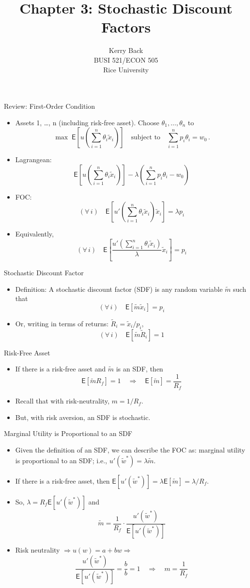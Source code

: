 \documentclass[10pt]{beamer}
\title{Chapter 3: Stochastic Discount Factors}
\date{}
\author{Kerry Back\\ 
BUSI 521/ECON 505\\
Rice University}
\newcommand{\bi}{\begin{itemize}}
\newcommand{\ei}{\end{itemize}}
\newcommand{\im}{\item}
\newcommand{\mye}{\ensuremath{\mathsf{E}}}
\newcommand{\tw}{\tilde{w}}
\newcommand{\tx}{\tilde{x}}
\newcommand{\tm}{\tilde{m}}
\newcommand{\tr}{\widetilde{R}}
\begin{document}
\maketitle



\begin{frame}{Review: First-Order Condition}
 \bi
 \im Assets 1, \ldots, n (including risk-free asset).  Choose $\theta_1, \ldots, \theta_n$ to 
 $$\max \; \mye\left[ u\left( \sum_{i=1}^n \theta_i\tx_i \right) \right] \quad \text{subject to} \quad \sum_{i=1}^n p_i \theta_i = w_0\,.$$
\im Lagrangean:
$$\mye\left[ u\left( \sum_{i=1}^n \theta_i\tx_i \right) \right] - \lambda \left( \sum_{i=1}^n p_i \theta_i - w_0 \right)$$
\im FOC:
$$(\forall \, i) \quad \mye\left[ u'\left( \sum_{i=1}^n \theta_i\tx_i \right) \tx_i \right] = \lambda p_i$$
\im Equivalently,
$$(\forall \, i) \quad \mye\left[ \frac{u'\left( \sum_{i=1}^n \theta_i\tx_i \right) }{\lambda}\tx_i \right] =  p_i$$
\ei
\end{frame}

\begin{frame}{Stochastic Discount Factor}
    \bi 
    \im Definition: A stochastic discount factor (SDF) is any random variable $\tm$ such that
    $$(\forall \, i) \quad \mye\left[ \tm\tx_i \right] =  p_i$$
    \im Or, writing in terms of returns: $\tr_i = \tx_i/p_i$,
    $$(\forall \, i) \quad \mye\left[ \tm\tr_i \right] =  1$$
    \ei 
\end{frame}

\begin{frame}{Risk-Free Asset}
    \bi 
    \im If there is a risk-free asset and $\tm$ is an SDF, then 
    $$\mye[\tm R_f] = 1 \quad \Rightarrow \quad \mye[\tm] = \frac{1}{R_f}$$
    \im Recall that with risk-neutrality, $ m =1/R_f$.
    \im But, with risk aversion, an SDF is stochastic.
    \ei 
\end{frame}

\begin{frame}{Marginal Utility is Proportional to an SDF}
    \bi 
    \im 
    Given the definition of an SDF, we can describe the FOC as: marginal utility is proportional to an SDF; i.e., $u'(\tw^*) = \lambda\tm$.
    \im If there is a risk-free asset, then $\mye[u'(\tw^*)] = \lambda \mye[\tm] = \lambda / R_f$.
    \im So, $\lambda = R_f \mye[u'(\tw^*)]$ and
    $$ \tm = \frac{1}{R_f} \cdot \frac{u'(\tw^*)}{\mye[u'(\tw^*)]}$$
    \im Risk neutrality $\Rightarrow u(w) = a + b w \Rightarrow$
    $$\frac{u'(\tw^*)}{\mye[u'(\tw^*)]} = \frac{b}{b} = 1 \quad \Rightarrow \quad m = \frac{1}{R_f}$$
    \ei 
\end{frame}
\end{document}
